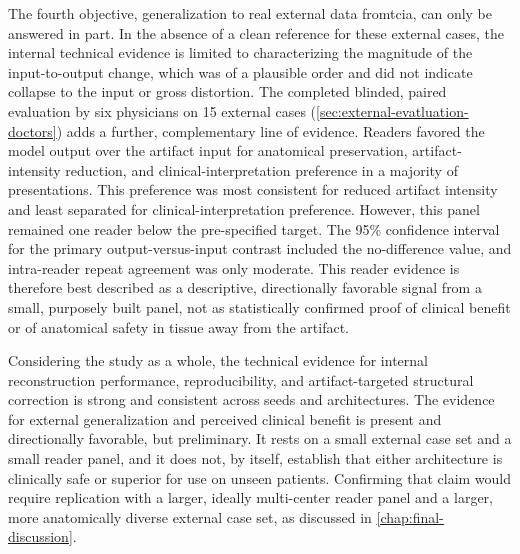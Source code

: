 The fourth objective, generalization to real external data from\acrshort{tcia}, can only be answered in part. In the absence of a clean reference for these external cases, the internal technical evidence is limited to characterizing the magnitude of the input-to-output change, which was of a plausible order and did not indicate collapse to the input or gross distortion. The completed blinded, paired evaluation by six physicians on 15 external cases (\autoref{sec:external-evatluation-doctors}) adds a further, complementary line of evidence. Readers favored the model output over the artifact input for anatomical preservation, artifact-intensity reduction, and clinical-interpretation preference in a majority of presentations. This preference was most consistent for reduced artifact intensity and least separated for clinical-interpretation preference. However, this panel remained one reader below the pre-specified target. The 95\% confidence interval for the primary output-versus-input contrast included the no-difference value, and intra-reader repeat agreement was only moderate. This reader evidence is therefore best described as a descriptive, directionally favorable signal from a small, purposely built panel, not as statistically confirmed proof of clinical benefit or of anatomical safety in tissue away from the artifact.

Considering the study as a whole, the technical evidence for internal reconstruction performance, reproducibility, and artifact-targeted structural correction is strong and consistent across seeds and architectures. The evidence for external generalization and perceived clinical benefit is present and directionally favorable, but preliminary. It rests on a small external case set and a small reader panel, and it does not, by itself, establish that either architecture is clinically safe or superior for use on unseen patients. Confirming that claim would require replication with a larger, ideally multi-center reader panel and a larger, more anatomically diverse external case set, as discussed in \autoref{chap:final-discussion}.

